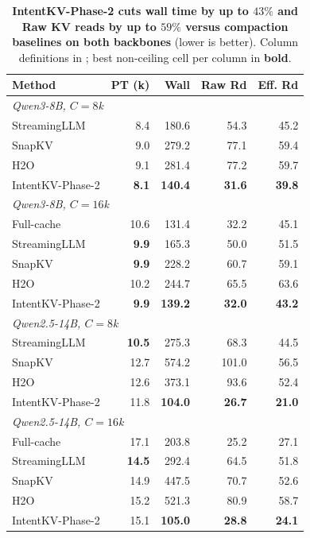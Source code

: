 \documentclass[11pt]{article}
\newcommand{\method}{IntentKV\xspace}
\newcommand{\learn}{Phase-2\xspace}
\begin{document}
\begin{table}[!htbp]
\centering
\footnotesize
\caption{\textbf{\method-\learn cuts wall time by up to $43\%$
and Raw KV reads by up to $59\%$ versus compaction baselines on
both backbones} (lower is better). Column definitions in
; best non-ceiling cell per column in
\textbf{bold}.}
\label{tab:system-efficiency}
\setlength{\tabcolsep}{4pt}
\begin{tabular*}{\columnwidth}{@{\extracolsep{\fill}} l rrrr}
\toprule
Method & PT (k) & Wall & Raw Rd & Eff. Rd \\
\midrule
\multicolumn{5}{l}{\emph{Qwen3-8B, $C{=}8$k}} \\
StreamingLLM    & 8.4          & 180.6          & 54.3          & 45.2 \\
SnapKV          & 9.0          & 279.2          & 77.1          & 59.4 \\
H2O             & 9.1          & 281.4          & 77.2          & 59.7 \\
\method-\learn  & \textbf{8.1} & \textbf{140.4} & \textbf{31.6} & \textbf{39.8} \\
\midrule
\multicolumn{5}{l}{\emph{Qwen3-8B, $C{=}16$k}} \\
Full-cache      & 10.6         & 131.4          & 32.2          & 45.1 \\
StreamingLLM    & \textbf{9.9} & 165.3          & 50.0          & 51.5 \\
SnapKV          & \textbf{9.9} & 228.2          & 60.7          & 59.1 \\
H2O             & 10.2         & 244.7          & 65.5          & 63.6 \\
\method-\learn  & \textbf{9.9} & \textbf{139.2} & \textbf{32.0} & \textbf{43.2} \\
\midrule
\multicolumn{5}{l}{\emph{Qwen2.5-14B, $C{=}8$k}} \\
StreamingLLM    & \textbf{10.5} & 275.3          & 68.3          & 44.5 \\
SnapKV          & 12.7          & 574.2          & 101.0         & 56.5 \\
H2O             & 12.6          & 373.1          & 93.6          & 52.4 \\
\method-\learn  & 11.8          & \textbf{104.0} & \textbf{26.7} & \textbf{21.0} \\
\midrule
\multicolumn{5}{l}{\emph{Qwen2.5-14B, $C{=}16$k}} \\
Full-cache      & 17.1          & 203.8          & 25.2          & 27.1 \\
StreamingLLM    & \textbf{14.5} & 292.4          & 64.5          & 51.8 \\
SnapKV          & 14.9          & 447.5          & 70.7          & 52.6 \\
H2O             & 15.2          & 521.3          & 80.9          & 58.7 \\
\method-\learn  & 15.1          & \textbf{105.0} & \textbf{28.8} & \textbf{24.1} \\
\bottomrule
\end{tabular*}
\end{table}
\end{document}
